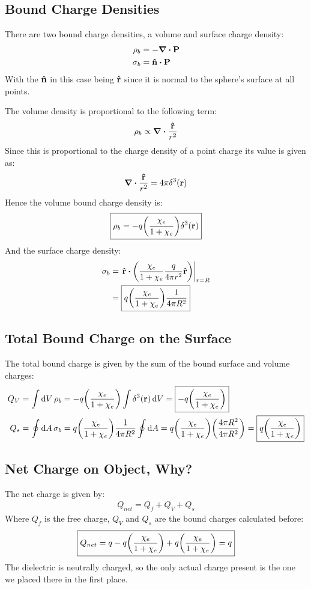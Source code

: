 \documentclass[12pt]{article}
\theoremstyle{plain}
\theoremstyle{definition}
\begin{document}
\subsection{Bound Charge Densities}
There are two bound charge densities, a volume and surface charge density:
\begin{align*}
  \rho_b&=-\div{\vb{P}}\\
  \sigma_b&=\vu{n}\vdot\vb{P}
\end{align*}
With the $\vu{n}$ in this case being $\vu{r}$ since it is normal to the sphere's surface at all points.

The volume density is proportional to the following term:
\begin{align*}
  \rho_b\propto \div{\frac{\vu{r}}{r^2}}
\end{align*}
Since this is proportional to the charge density of a point charge its value is given as:
\begin{align*}
  \div{\frac{\vu{r}}{r^2}}=4\pi\delta^3(\vb{r})
\end{align*}
Hence the volume bound charge density is:
\begin{align*}
  \boxed{\rho_b=-q\qty(\frac{\chi_e}{1+\chi_e})\delta^3(\vb{r})}
\end{align*}
And the surface charge density:
\begin{align*}
  \sigma_b&=\eval{\vu{r}\vdot\qty(\frac{\chi_e}{1+\chi_e}\frac{q}{4\pi r^2}\vu{r})}_{r=R}\\
  &=\boxed{q\qty(\frac{\chi_e}{1+\chi_e})\frac{1}{4\pi R^2}}
\end{align*}
\subsection{Total Bound Charge on the Surface}
The total bound charge is given by the sum of the bound surface and volume charges:
\begin{align*}
  Q_V&=\int\dd{V}\rho_b=-q\qty(\frac{\chi_e}{1+\chi_e})
  \int\delta^3(\vb{r})\dd{V}=\boxed{-q\qty(\frac{\chi_e}{1+\chi_e})}\\
  Q_s&=\oint\dd{A}\sigma_b=q\qty(\frac{\chi_e}{1+\chi_e})
  \frac{1}{4\pi R^2}\oint\dd{A}=q\qty(\frac{\chi_e}{1+\chi_e})
  \qty(\frac{4\pi R^2}{4\pi R^2})=\boxed{q\qty(\frac{\chi_e}{1+\chi_e})}
\end{align*}
\subsection{Net Charge on Object, Why?}
The net charge is given by:
\begin{align*}
  Q_{net}=Q_f+Q_V+Q_s
\end{align*}
Where $Q_f$ is the free charge, $Q_V$ and $Q_s$ are the bound charges calculated before:
\begin{equation*}
  \boxed{
    Q_{net}=q-q\qty(\frac{\chi_e}{1+\chi_e})+q\qty(\frac{\chi_e}{1+\chi_e})=q
  }
\end{equation*}
The dielectric is neutrally charged, so the only actual charge present is the one we placed there in the first place.
\end{document}
